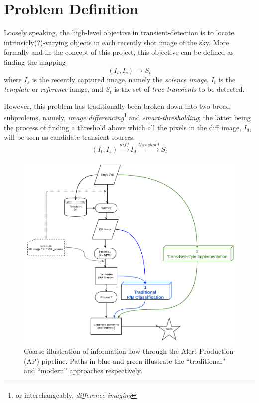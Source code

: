\section{Problem Definition}
\label{sec:definition}

Loosely speaking, the high-level objective in transient-detection is to locate intrinsicly(?)-varying objects in each recently shot image of the sky.
More formally and in the concept of this project, this objective can be defined as finding the mapping
\begin{equation}
  \label{eq:def1}
  (I_t,I_s) \longrightarrow S_t 
\end{equation}
where $I_s$ is the recently captured image, namely the \emph{science image}. $I_t$ is the \emph{template} or \emph{reference} iamge, and $S_t$ is the set of \emph{true transients} to be detected.


However, this problem has traditionally been broken down into two broad subprolems, namely, \emph{image differencing}\footnote{or interchangeably, \emph{difference imaging}} and \emph{smart-thresholding}; the latter being the process of finding a threshold above which all the pixels in the diff image, $I_d$, will be seen as candidate transient sources:
\begin{equation}
  \label{eq:def2}
  (I_t,I_s) \xrightarrow{diff} I_d \xrightarrow{threshold} S_t 
\end{equation}

\begin{figure}[h]
  \centering
  \includegraphics[width=.8\textwidth]{material/diagram}
  \caption{Coarse illustration of information flow through the Alert Production (AP) pipeline. Paths in blue and green illustrate the ``traditional'' and ``modern'' approaches respectively.}
  \label{fig:diagram}
\end{figure}


